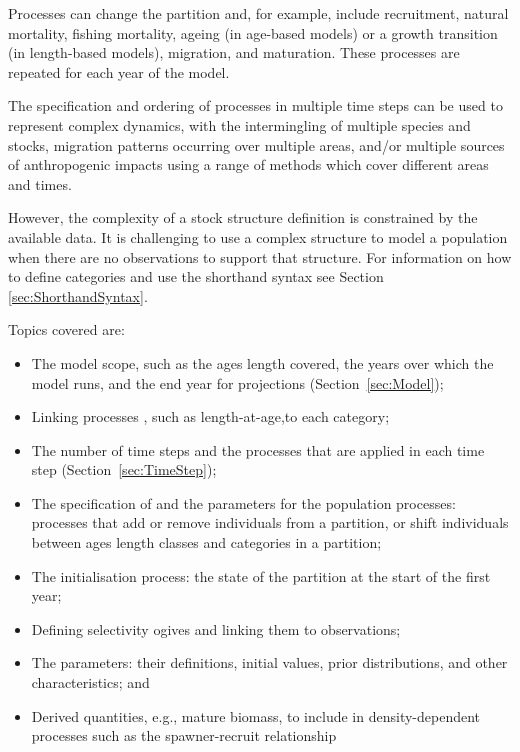 Processes can change the partition and, for example, include recruitment, natural mortality, fishing mortality, ageing (in age-based models) or a growth transition (in length-based models), migration, and maturation. These processes are repeated for each year of the model.

The specification and ordering of processes in multiple time steps can be used to represent complex dynamics, with the intermingling of multiple species and stocks, migration patterns occurring over multiple areas, and/or multiple sources of anthropogenic impacts using a range of methods which cover different areas and times.

However, the complexity of a stock structure definition is constrained by the available data. It is challenging to use a complex structure to model a population when there are no observations to support that structure.  For information on how to define categories and use the shorthand syntax see Section \ref{sec:ShorthandSyntax}.

Topics covered are:

\begin{itemize}
	\item The model scope, such as the \ifAgeBased ages \else length \fi covered, the years over which the model runs, and the end year for projections (Section~\ref{sec:Model});
    \item Linking processes \ifAgeBased, such as length-at-age,\fi to each category;
    \item The number of time steps and the processes that are applied in each time step (Section~\ref{sec:TimeStep});
    \item The specification of and the parameters for the population processes: processes that add or remove individuals from a partition, or shift individuals between \ifAgeBased ages \else length classes \fi and categories in a partition;
    \item The initialisation process: the state of the partition at the start of the first year;
   \item Defining selectivity ogives and linking them to observations;
   \item The parameters: their definitions, initial values, prior distributions, and other characteristics; and
   \item Derived quantities, e.g., mature biomass, to include in density-dependent processes such as the spawner-recruit relationship
\end{itemize}

